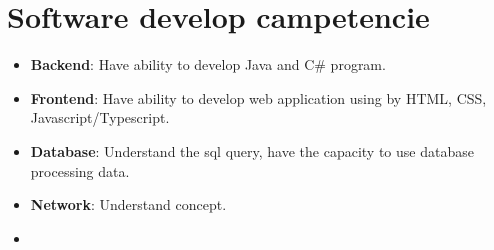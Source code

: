 \section*{{\faCode} Software develop campetencie}
\vspace*{-0.5cm}
    \begin{multicols}{2}    
    \begin{itemize}
    \footnotesize
        \item \textbf{Backend}: Have ability to develop Java and C\# program.
        \item \textbf{Frontend}: Have ability to develop web application using by HTML, CSS, Javascript/Typescript.
        \item \textbf{Database}: Understand the sql query, have the capacity to use database processing data.
        \item \textbf{Network}: Understand concept.
        \item[\vspace{\fill}]
    \end{itemize}
    \end{multicols}